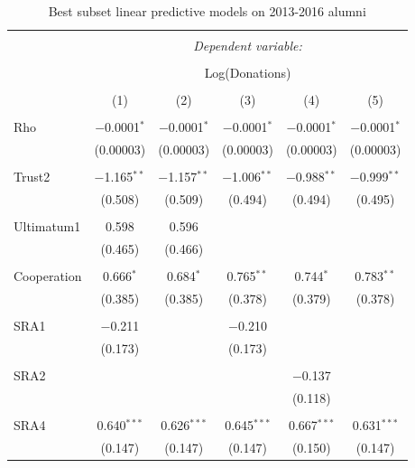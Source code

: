\newpage

\begin{table}[H] \centering 
  \caption{Best subset linear predictive models on 2013-2016 alumni} 
  \label{} 
    \begin{adjustbox}{width=\textwidth}
\begin{tabular}{@{\extracolsep{5pt}}lccccc} 
\\[-1.8ex]\hline 
\hline \\[-1.8ex] 
 & \multicolumn{5}{c}{\textit{Dependent variable:}} \\ 
\cline{2-6} 
\\[-1.8ex] & \multicolumn{5}{c}{Log(Donations)} \\ 
\\[-1.8ex] & (1) & (2) & (3) & (4) & (5)\\ 
\hline \\[-1.8ex] 
 Rho & $-$0.0001$^{*}$ & $-$0.0001$^{*}$ & $-$0.0001$^{*}$ & $-$0.0001$^{*}$ & $-$0.0001$^{*}$ \\ 
  & (0.00003) & (0.00003) & (0.00003) & (0.00003) & (0.00003) \\ 
  & & & & & \\ 
 Trust2 & $-$1.165$^{**}$ & $-$1.157$^{**}$ & $-$1.006$^{**}$ & $-$0.988$^{**}$ & $-$0.999$^{**}$ \\ 
  & (0.508) & (0.509) & (0.494) & (0.494) & (0.495) \\ 
  & & & & & \\ 
 Ultimatum1 & 0.598 & 0.596 &  &  &  \\ 
  & (0.465) & (0.466) &  &  &  \\ 
  & & & & & \\ 
 Cooperation & 0.666$^{*}$ & 0.684$^{*}$ & 0.765$^{**}$ & 0.744$^{*}$ & 0.783$^{**}$ \\ 
  & (0.385) & (0.385) & (0.378) & (0.379) & (0.378) \\ 
  & & & & & \\ 
 SRA1 & $-$0.211 &  & $-$0.210 &  &  \\ 
  & (0.173) &  & (0.173) &  &  \\ 
  & & & & & \\ 
 SRA2 &  &  &  & $-$0.137 &  \\ 
  &  &  &  & (0.118) &  \\ 
  & & & & & \\ 
 SRA4 & 0.640$^{***}$ & 0.626$^{***}$ & 0.645$^{***}$ & 0.667$^{***}$ & 0.631$^{***}$ \\ 
  & (0.147) & (0.147) & (0.147) & (0.150) & (0.147) \\ 

\end{tabular}
\end{adjustbox}
\end{table}
